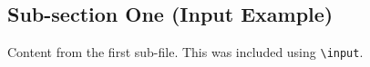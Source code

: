 \subsection*{Sub-section One (Input Example)}
Content from the first sub-file. This was included using \texttt{\textbackslash input}.


